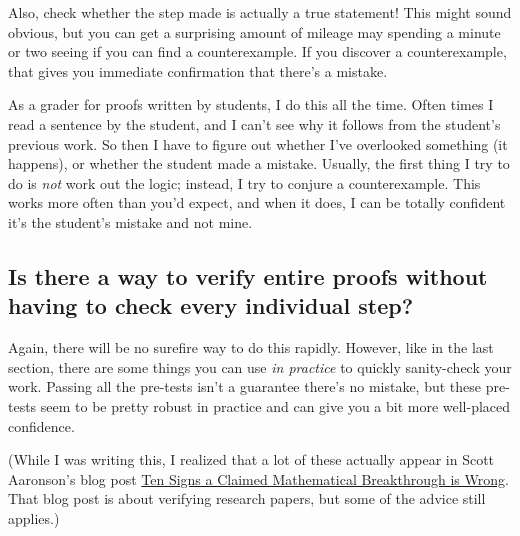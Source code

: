 \documentclass[11pt]{scrartcl}
\begin{document}
\begin{itemize}
  \ii Also, \alert{check whether the step made is actually a true statement}!
  This might sound obvious, but you can get a surprising amount of mileage
  may spending a minute or two seeing if you can find a counterexample.
  If you discover a counterexample,
  that gives you immediate confirmation that there's a mistake.

  As a grader for proofs written by students, I do this all the time.
  Often times I read a sentence by the student,
  and I can't see why it follows from the student's previous work.
  So then I have to figure out whether I've overlooked something (it happens),
  or whether the student made a mistake.
  Usually, the first thing I try to do is \emph{not} work out the logic;
  instead, I try to conjure a counterexample.
  This works more often than you'd expect, and when it does,
  I can be totally confident it's the student's mistake and not mine.
\end{itemize}

\subsection{Is there a way to verify entire proofs
  without having to check every individual step?}

Again, there will be no surefire way to do this rapidly.
However, like in the last section, there are some things you can use
\emph{in practice} to quickly sanity-check your work.
Passing all the pre-tests isn't a guarantee there's no mistake,
but these pre-tests seem to be pretty robust in practice and can
give you a bit more well-placed confidence.

(While I was writing this, I realized that a lot of these
actually appear in Scott Aaronson's blog post
\href{https://scottaaronson.blog/?p=304}
{Ten Signs a Claimed Mathematical Breakthrough is Wrong}.
That blog post is about verifying research papers,
but some of the advice still applies.)
\end{document}
